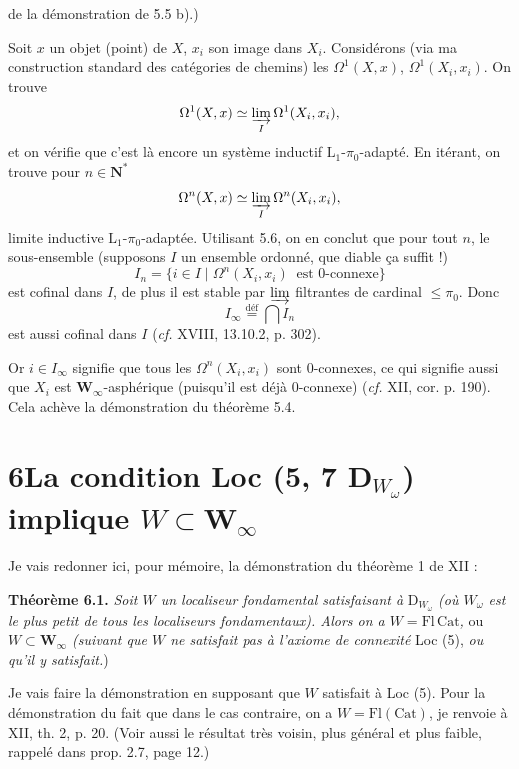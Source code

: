 \documentclass[11pt]{article}
\newcommand{\printedpage}[1]{\marginpar{\footnotesize p.~#1}}
\newcommand{\msp}[1]{\marginpar{\footnotesize [#1]}}
\begin{document}
\printedpage{44}

\msp{page 82}
de la démonstration de 5.5 b).)

Soit $x$ un objet (point) de $X$, $x_i$ son image dans $X_i$. Considérons (via ma construction standard des catégories de chemins) les $\Omega^1(X,x)$, $\Omega^1(X_i,x_i)$. On trouve
\[ \Omega^1(X,x) \simeq \varinjlim_{I} \Omega^1(X_i,x_i), \]
et on vérifie que c'est là encore un système inductif $\mathrm{L}_1$-$\pi_0$-adapté. En itérant, on trouve pour $n \in \mathbf{N}^*$
\[ \Omega^n(X,x) \simeq \varinjlim_{I} \Omega^n(X_i,x_i), \]
limite inductive $\mathrm{L}_1$-$\pi_0$-adaptée. Utilisant 5.6, on en conclut que pour tout $n$, le sous-ensemble (supposons $I$ un ensemble ordonné, que diable ça suffit !)
\[ I_n = \{ i \in I \mid \Omega^n(X_i,x_i) \ \text{ est 0-connexe} \} \]
est cofinal dans $I$, de plus il est stable par $\varinjlim$ filtrantes de cardinal $\leq \pi_0$. Donc %
\[ I_\infty \overset{\text{déf}}{=} \bigcap I_n \]
est aussi cofinal dans $I$ (\textit{cf.} XVIII, 13.10.2, p. 302).

\msp{page 83}
Or $i \in I_\infty$ signifie que tous les $\Omega^n(X_i,x_i)$ sont 0-connexes, ce qui signifie aussi que $X_i$ est $\mathbf{W}_\infty$-asphérique (puisqu'il est déjà 0-connexe) (\textit{cf.} XII, cor. p. 190). Cela achève la démonstration du théorème 5.4.

\section*{6\quad La condition Loc (5, 7 D$_{W_\omega}$) implique $W \subset \mathbf{W}_\infty$}

Je vais redonner ici, pour mémoire, la démonstration du théorème 1 de XII :

\textbf{Théorème 6.1.} \textit{Soit $W$ un localiseur fondamental satisfaisant à} D$_{W_\omega}$ \textit{(où $W_\omega$ est le plus petit de tous les localiseurs fondamentaux). Alors on a $W = \mathrm{Fl}\,\mathrm{Cat}$,} ou \textit{$W \subset \mathbf{W}_\infty$ (suivant que $W$ ne satisfait pas à l'axiome de connexité} Loc (5), \textit{ou qu'il y satisfait.})

Je vais faire la démonstration en supposant que $W$ satisfait à Loc (5). Pour la démonstration du fait que dans le cas contraire, on a $W = \mathrm{Fl}(\mathrm{Cat})$, je renvoie à XII, th. 2, p. 20. (Voir aussi le résultat très voisin, plus général et plus faible, rappelé dans prop. 2.7, page 12.)
\end{document}
